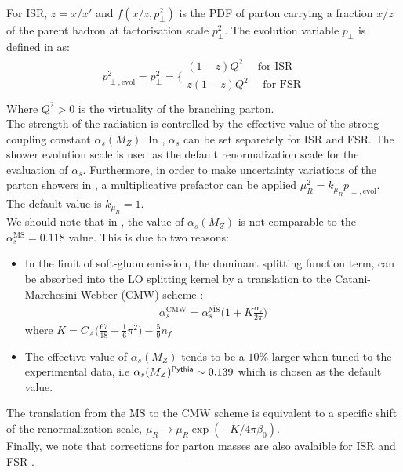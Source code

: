 For ISR, $z=x/x'$ and $f(x/z,p_\perp^2)$ is the PDF of parton carrying a fraction $x/z$
of the parent hadron at factorisation scale $p_\perp^2$. The evolution variable $p_\perp$ is defined in 
\Pythia as:
\begin{eqnarray}
 p_{\perp,\text{evol}}^2 = p_\perp^2 = \bigg\{ \begin{array}{c}
                            (1-z) Q^2 \quad \text{ for ISR} \\
                            z (1-z) Q^2 \quad \text{ for FSR} \\
                           \end{array}
\end{eqnarray}
Where $Q^2 > 0$ is the virtuality of the branching parton. \\
The strength of the radiation is controlled by the effective value of the 
strong coupling constant $\alpha_s(M_Z)$. In \Pythia, $\alpha_s$ can be 
set separetely for ISR and FSR. The shower evolution scale is used as the 
default renormalization scale for the evaluation of $\alpha_s$. Furthermore,
in order to make uncertainty variations of the parton showers in \Pythia, a 
multiplicative prefactor can be applied $\mu_R^2 = k_{\mu_R} p_{\perp, \text{evol}}$. The default 
value is $k_{\mu_R} = 1$. \\
We should note that in \Pythia, the value of $\alpha_s(M_Z)$ is not comparable
to the $\alpha_s^{\overline{\text{MS}}}=0.118$ value. This is due to two reasons:
\begin{itemize}
 \item In the limit of soft-gluon emission, the dominant splitting function
   term, can be absorbed into the LO splitting kernel by a translation to the
   Catani-Marchesini-Webber (CMW) scheme \cite{Catani:1990rr}:
 \begin{eqnarray}
  \alpha_s^{\text{CMW}} = \alpha_s^{\overline{\text{MS}}} \bigg(1 + K \frac{\alpha_s}{2 \pi} \bigg)
 \end{eqnarray}
where $K = C_A \bigg(\frac{67}{18} - \frac{1}{6} \pi^2 \bigg) - \frac{5}{9} n_f$
\item The effective value of $\alpha_s(M_Z)$ tends to be a $10\%$ larger when tuned to the experimental
data, i.e $\alpha_s(M_Z)^{\protect\textsf{Pythia}} \sim 0.139$ which is chosen as the default value.
\end{itemize}
The translation from the $\overline{\text{MS}}$ to the CMW scheme is equivalent
to a specific shift of the renormalization scale, $\mu_R \to \mu_R \exp(-K/4\pi\beta_0)$. \\
Finally, we note that corrections for parton masses are also avalaible for ISR \cite{Sjostrand:2004ef} 
and FSR \cite{Norrbin:2000uu}.

